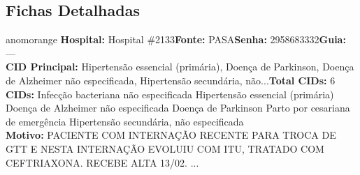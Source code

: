 \documentclass[a4paper,10pt]{article}
\begin{document}
\subsection{Fichas Detalhadas}
\begin{anomalycard}[Interna\c{c}\~{a}o \#185259 | Pac. \#82325 | ALTO (z=3.17) | LOS: 8d | 03/03/2026\,$\to$\,11/03/2026]{anomorange}
\textbf{Hospital:} Hospital \#2133\quad \textbf{Fonte:} PASA\quad \textbf{Senha:} 2958683332\quad \textbf{Guia:} ---\\

\textbf{CID Principal:} {\small Hipertensão essencial (primária), Doença de Parkinson, Doença de Alzheimer não especificada, Hipertensão secundária, não...}\quad\textbf{Total CIDs:} 6\\

\textbf{CIDs:} {\scriptsize Infecção bacteriana não especificada \textbar{} Hipertensão essencial (primária) \textbar{} Doença de Alzheimer não especificada \textbar{} Doença de Parkinson \textbar{} Parto por cesariana de emergência \textbar{} Hipertensão secundária, não especificada}\\

\textbf{Motivo:} {\scriptsize PACIENTE COM INTERNAÇÃO RECENTE PARA TROCA DE GTT E NESTA INTERNAÇÃO EVOLUIU COM ITU, TRATADO COM CEFTRIAXONA. RECEBE ALTA 13/02. ...}\\



\end{anomalycard}
\end{document}
